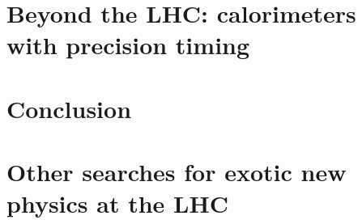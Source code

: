 \documentclass[12pt]{caltech_thesis}
\begin{document}
\part{Beyond the LHC: calorimeters with precision timing}
\label{part:timing}

\part{Conclusion}
\label{part:conclusion}



\appendix
\part{Other searches for exotic new physics at the LHC}
\label{part:app}




%

\printbibliography[heading=bibintoc]

\printindex
\end{document}
